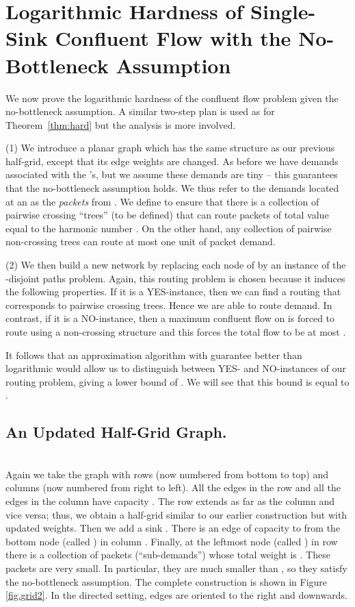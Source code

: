 \documentclass[12pt]{article}
\begin{document}
\section{Logarithmic Hardness of Single-Sink Confluent Flow with the No-Bottleneck Assumption}
\label{sec:confwithNBA}

We now prove the logarithmic hardness of the confluent flow problem given
the no-bottleneck assumption.
A similar two-step plan is used as for Theorem~\ref{thm:hard} but the analysis is
more involved.

(1) We introduce a planar graph  which has the same structure as our previous half-grid, except
that its edge weights are changed. As before we  have demands associated with the 's, but we assume these demands
are tiny -- this  guarantees that the no-bottleneck assumption holds.
We thus refer to the demands located at an  as the {\em  packets} from .
We define  to ensure that there is a
collection of pairwise crossing ``trees'' (to be defined) that can route
packets of total value equal to the harmonic number .
On the other hand, any collection of pairwise non-crossing trees can route at
most one unit of packet demand.


(2) We then build a new network  by replacing each node of  by
an instance of the -disjoint paths problem. Again, this routing problem is chosen
because it induces the following properties. If it is a YES-instance, then we can find a routing that
corresponds to pairwise crossing trees. Hence we are able to route  demand.
In contrast, if it is a NO-instance, then a maximum confluent flow on  is forced to route using a non-crossing
structure and this forces the total flow to be at most .


It follows that an approximation algorithm with guarantee better than
logarithmic would allow us to distinguish between YES- and NO-instances of our
routing problem, giving a lower bound of . We will see that
this bound is equal to .





\subsection{{An Updated Half-Grid Graph.}}\ \\
Again we take the graph  with  rows (now numbered from
 bottom to top) and  columns (now numbered from right to left).  All the edges
in the  row and all the edges in the  column have capacity
.  The  row extends as far as the  column and vice
versa; thus, we obtain a half-grid similar to our earlier construction but with updated  weights.
 Then we add a sink .
There is an edge of capacity  to  from the bottom node (called ) in column .
Finally, at the leftmost node (called ) in row  there is a collection of packets (``sub-demands'')
whose total weight is . These packets are very small. In particular,
they are much smaller than , so they satisfy the no-bottleneck assumption.
The complete construction is shown in Figure \ref{fig.grid2}.
In the directed setting, edges are oriented to the right and downwards.
\end{document}
